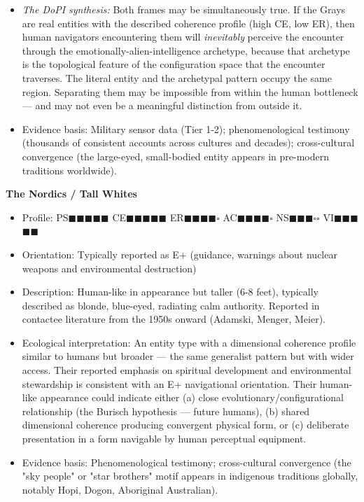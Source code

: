 \begin{itemize}[nosep,leftmargin=*]
  \item \textit{The DoPI synthesis:} Both frames may be simultaneously true. If the Grays are real entities with the described coherence profile (high CE, low ER), then human navigators encountering them will \textit{inevitably} perceive the encounter through the emotionally-alien-intelligence archetype, because that archetype is the topological feature of the configuration space that the encounter traverses. The literal entity and the archetypal pattern occupy the same region. Separating them may be impossible from within the human bottleneck — and may not even be a meaningful distinction from outside it.
  \item Evidence basis: Military sensor data (Tier 1-2); phenomenological testimony (thousands of consistent accounts across cultures and decades); cross-cultural convergence (the large-eyed, small-bodied entity appears in pre-modern traditions worldwide).
\end{itemize}


\textbf{The Nordics / Tall Whites}

\begin{itemize}[nosep,leftmargin=*]
  \item Profile: PS$\blacksquare$$\blacksquare$$\blacksquare$$\blacksquare$$\blacksquare$ CE$\blacksquare$$\blacksquare$$\blacksquare$$\blacksquare$$\blacksquare$ ER$\blacksquare$$\blacksquare$$\blacksquare$$\blacksquare$$\square$ AC$\blacksquare$$\blacksquare$$\blacksquare$$\blacksquare$$\square$ NS$\blacksquare$$\blacksquare$$\blacksquare$$\square$$\square$ VI$\blacksquare$$\blacksquare$$\blacksquare$$\blacksquare$$\blacksquare$
  \item Orientation: Typically reported as E+ (guidance, warnings about nuclear weapons and environmental destruction)
  \item Description: Human-like in appearance but taller (6-8 feet), typically described as blonde, blue-eyed, radiating calm authority. Reported in contactee literature from the 1950s onward (Adamski, Menger, Meier).
  \item Ecological interpretation: An entity type with a dimensional coherence profile similar to humans but broader — the same generalist pattern but with wider access. Their reported emphasis on spiritual development and environmental stewardship is consistent with an E+ navigational orientation. Their human-like appearance could indicate either (a) close evolutionary/configurational relationship (the Burisch hypothesis — future humans), (b) shared dimensional coherence producing convergent physical form, or (c) deliberate presentation in a form navigable by human perceptual equipment.
  \item Evidence basis: Phenomenological testimony; cross-cultural convergence (the "sky people" or "star brothers" motif appears in indigenous traditions globally, notably Hopi, Dogon, Aboriginal Australian).
\end{itemize}


